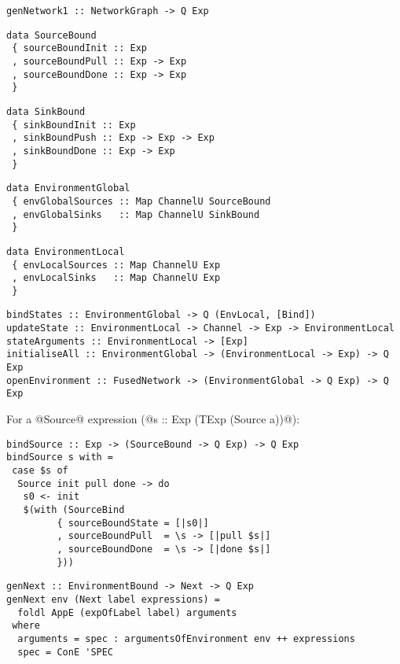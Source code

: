 \begin{lstlisting}
genNetwork1 :: NetworkGraph -> Q Exp
\end{lstlisting}


\begin{lstlisting}
data SourceBound
 { sourceBoundInit :: Exp
 , sourceBoundPull :: Exp -> Exp
 , sourceBoundDone :: Exp -> Exp
 }
\end{lstlisting}

\begin{lstlisting}
data SinkBound
 { sinkBoundInit :: Exp
 , sinkBoundPush :: Exp -> Exp -> Exp
 , sinkBoundDone :: Exp -> Exp
 }
\end{lstlisting}

\begin{lstlisting}
data EnvironmentGlobal
 { envGlobalSources :: Map ChannelU SourceBound
 , envGlobalSinks   :: Map ChannelU SinkBound
 }
\end{lstlisting}

\begin{lstlisting}
data EnvironmentLocal
 { envLocalSources :: Map ChannelU Exp
 , envLocalSinks   :: Map ChannelU Exp
 }
\end{lstlisting}

\begin{lstlisting}
bindStates :: EnvironmentGlobal -> Q (EnvLocal, [Bind])
updateState :: EnvironmentLocal -> Channel -> Exp -> EnvironmentLocal
stateArguments :: EnvironmentLocal -> [Exp]
initialiseAll :: EnvironmentGlobal -> (EnvironmentLocal -> Exp) -> Q Exp
openEnvironment :: FusedNetwork -> (EnvironmentGlobal -> Q Exp) -> Q Exp
\end{lstlisting}



For a @Source@ expression (@s :: Exp (TExp (Source a))@):
\begin{lstlisting}
bindSource :: Exp -> (SourceBound -> Q Exp) -> Q Exp
bindSource s with =
 case $s of
  Source init pull done -> do
   s0 <- init
   $(with (SourceBind
         { sourceBoundState = [|s0|]
         , sourceBoundPull  = \s -> [|pull $s|]
         , sourceBoundDone  = \s -> [|done $s|]
         }))
\end{lstlisting}

\begin{lstlisting}
genNext :: EnvironmentBound -> Next -> Q Exp
genNext env (Next label expressions) =
  foldl AppE (expOfLabel label) arguments
 where
  arguments = spec : argumentsOfEnvironment env ++ expressions
  spec = ConE 'SPEC
\end{lstlisting}

